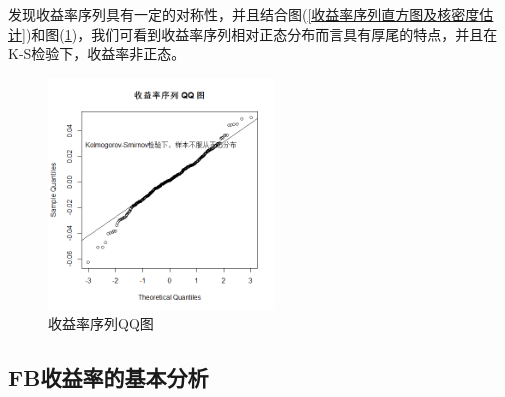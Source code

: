         发现收益率序列具有一定的对称性，并且结合图(\ref{收益率序列直方图及核密度估计})和图(\ref{收益率序列QQ图})，我们可看到收益率序列相对正态分布而言具有厚尾的特点，并且在K-S检验下，收益率非正态。
            \begin{figure}[H]
            \centering
            \includegraphics[width=6cm]{images/rate_of_return_sequence_QQ.jpg}
            \caption{收益率序列QQ图}
            \label{收益率序列QQ图}
            \end{figure}
    \subsection{FB收益率的基本分析}
